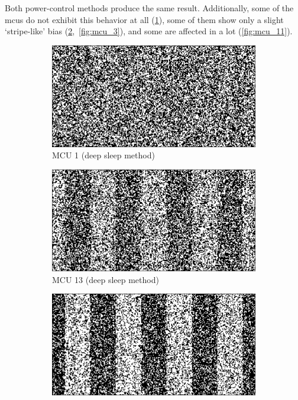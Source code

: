 Both power-control methods produce the same result. Additionally, some of the \glspl{mcu} do not exhibit this behavior at all (\ref{fig:mcu_1}), some of them show only a slight `stripe-like' bias (\ref{fig:mcu_13},~\ref{fig:mcu_3}), and some are affected in a lot (\ref{fig:mcu_11}).

\begin{figure}[ht!]
        \centering
        \captionsetup{justification=centering,margin=0.5cm}
        \begin{subfigure}[b]{0.475\textwidth}
            \centering
            \includegraphics[width=\textwidth]{images/1_response_sleep.png}
            \caption{MCU 1 (deep sleep method)}    
            \label{fig:mcu_1}
        \end{subfigure}
        \hfill
        \begin{subfigure}[b]{0.475\textwidth}  
            \centering 
            \includegraphics[width=\textwidth]{images/13_response_sleep.png}
            \caption{MCU 13 (deep sleep method)}    
            \label{fig:mcu_13}
        \end{subfigure}
        \vskip 1.75mm
        \begin{subfigure}[b]{0.475\textwidth}   
            \centering 
            \includegraphics[width=\textwidth]{images/11_response_rtc.png}

\end{subfigure}
\end{figure}
